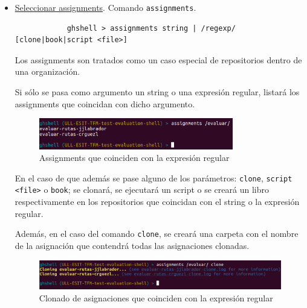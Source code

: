 \begin{itemize}
	
	
\newpage
	
	\item \underline{Seleccionar assignments}. Comando \verb|assignments|.
	
		\begin{verbatim}
			ghshell > assignments string | /regexp/ [clone|book|script <file>]
		\end{verbatim}
		
		Los assignments son tratados como un caso especial de repositorios dentro de una organización.
		
		Si sólo se pasa como argumento un string o una expresión regular, listará los assignments que coincidan con dicho argumento.
		
		\begin{figure}[H]
		\begin{center}
		\includegraphics[width=0.8\textwidth]{images/assignments1-1}
		\caption{Assignments que coinciden con la expresión regular}
		\label{fig:assignment1-1}
		\end{center}
		\end{figure}
		
		
		En el caso de que además se pase alguno de los parámetros: \verb|clone|, \verb|script <file>| o \verb|book|; se clonará, se ejecutará un script o se creará un libro respectivamente en los repositorios que coincidan con el string o la expresión regular. 
\bigskip

Además, en el caso del comando \verb|clone|, se creará una carpeta con el nombre de la asignación que contendrá todas las asignaciones clonadas.
	
		\begin{figure}[H]
		\begin{center}
		\includegraphics[width=1\textwidth]{images/ghshell6-1}
		\caption{Clonado de asignaciones que coinciden con la expresión regular}
		\label{fig:ghshell6-1}
		\end{center}
		\end{figure}
		

\end{itemize}
